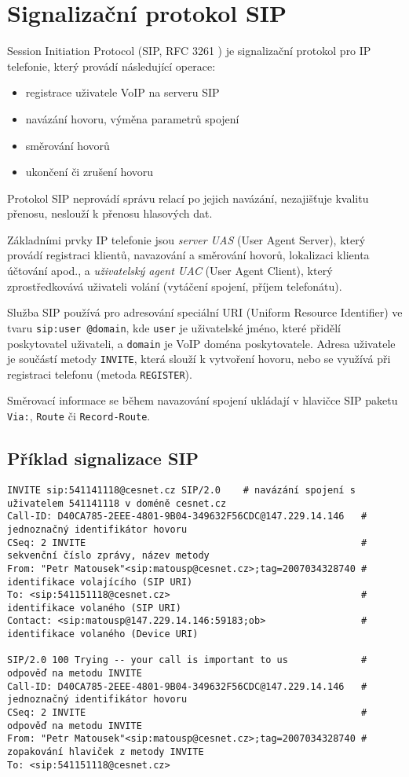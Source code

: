 \section{Signalizační protokol SIP}\label{sip}
Session Initiation Protocol (SIP, RFC 3261 \cite{rfc3261}) je signalizační protokol pro IP telefonie, který provádí následující operace:
\begin{itemize}
    \item registrace uživatele VoIP na serveru SIP
    \item navázání hovoru, výměna parametrů spojení
    \item směrování hovorů
    \item ukončení či zrušení hovoru
\end{itemize}

Protokol SIP neprovádí správu relací po jejich navázání, nezajišťuje kvalitu přenosu, neslouží k přenosu hlasových dat.

Základními prvky IP telefonie jsou {\em server UAS} (User Agent Server), který provádí registraci klientů, navazování a směrování hovorů, lokalizaci klienta účtování apod., a {\em uživatelský agent UAC} (User Agent Client), který zprostředkovává uživateli volání (vytáčení spojení, příjem telefonátu). 

Služba SIP používá pro adresování speciální URI (Uniform Resource Identifier) ve tvaru {\tt sip:user @domain}, kde {\tt user} je uživatelské jméno, které přidělí poskytovatel uživateli, a {\tt domain} je VoIP doména poskytovatele. Adresa uživatele je součástí metody {\tt INVITE}, která slouží k vytvoření hovoru, nebo se využívá při registraci telefonu (metoda {\tt REGISTER}). 

Směrovací informace se během navazování spojení ukládají v hlavičce SIP paketu {\tt Via:}, {\tt Route} či {\tt Record-Route}. 

\subsection{Příklad signalizace SIP}
{\footnotesize
\begin{verbatim}
INVITE sip:541141118@cesnet.cz SIP/2.0    # navázání spojení s uživatelem 541141118 v doméně cesnet.cz
Call-ID: D40CA785-2EEE-4801-9B04-349632F56CDC@147.229.14.146   # jednoznačný identifikátor hovoru
CSeq: 2 INVITE                                                 # sekvenční číslo zprávy, název metody
From: "Petr Matousek"<sip:matousp@cesnet.cz>;tag=2007034328740 # identifikace volajícího (SIP URI)
To: <sip:541151118@cesnet.cz>                                  # identifikace volaného (SIP URI)
Contact: <sip:matousp@147.229.14.146:59183;ob>                 # identifikace volaného (Device URI)

SIP/2.0 100 Trying -- your call is important to us             # odpověď na metodu INVITE
Call-ID: D40CA785-2EEE-4801-9B04-349632F56CDC@147.229.14.146   # jednoznačný identifikátor hovoru
CSeq: 2 INVITE                                                 # odpověď na metodu INVITE   
From: "Petr Matousek"<sip:matousp@cesnet.cz>;tag=2007034328740 # zopakování hlaviček z metody INVITE
To: <sip:541151118@cesnet.cz>
\end{verbatim}
}

